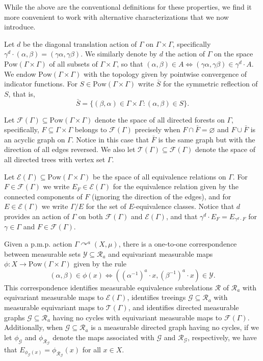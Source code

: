 \documentclass[12pt]{amsart}
\theoremstyle{definition}
\def\cal{\mathcal}
\newcommand{\pmp}{p{$.$}m{$.$}p{$.$}}
\newcommand{\acts}{\curvearrowright}
\newcommand{\Pow}[1]{\mathrm{Pow}(#1)}
\begin{document}
While the above are the conventional definitions for these properties, we find it more convenient to work with alternative characterizations that we now introduce.

Let $d$ be the diagonal translation action of $\Gamma$ on $\Gamma \times \Gamma$, specifically $\gamma^d \cdot (\alpha, \beta) = (\gamma \alpha, \gamma \beta)$. We similarly denote by $d$ the action of $\Gamma$ on the space $\Pow{\Gamma \times \Gamma}$ of all subsets of $\Gamma \times \Gamma$, so that $(\alpha, \beta) \in A \Leftrightarrow (\gamma \alpha, \gamma \beta) \in \gamma^d \cdot A$. We endow $\Pow{\Gamma \times \Gamma}$ with the topology given by pointwise convergence of indicator functions. For $S \in \Pow{\Gamma \times \Gamma}$ write $\bar S$ for the symmetric reflection of $S$, that is, $$\bar S = \{(\beta, \alpha) \in \Gamma \times \Gamma : (\alpha, \beta) \in S\}.$$

Let $\cal F(\Gamma) \subseteq \Pow{\Gamma \times \Gamma}$ denote the space of all directed forests on $\Gamma$, specifically, $F \subseteq \Gamma \times \Gamma$ belongs to $\cal F(\Gamma)$ precisely when $F \cap \bar F = \varnothing$ and $F \cup \bar F$ is an acyclic graph on $\Gamma$. Notice in this case that $\bar F$ is the same graph but with the direction of all edges reversed.  We also let $\cal T(\Gamma) \subseteq \cal F(\Gamma)$ denote the space of all directed trees with vertex set $\Gamma$.

Let $\cal E(\Gamma) \subseteq \Pow{\Gamma \times \Gamma}$ be the space of all equivalence relations on $\Gamma$. For $F \in \cal F(\Gamma)$ we write $E_F \in \cal E(\Gamma)$ for the equivalence relation given by the connected components of $F$ (ignoring the direction of the edges), and for $E \in \cal E(\Gamma)$ we write $\Gamma / E$ for the set of $E$-equivalence classes. Notice that $d$ provides an action of $\Gamma$ on both $\cal F(\Gamma)$ and $\cal E(\Gamma)$, and that $\gamma^d \cdot E_F = E_{\gamma^d \cdot F}$ for $\gamma \in \Gamma$ and $F \in \cal F(\Gamma)$.

Given a {\pmp} action $\Gamma \acts^a (X, \mu)$, there is a one-to-one correspondence between measurable sets $\cal Y \subseteq \cal R_a$ and equivariant measurable maps $\phi : X \rightarrow \Pow{\Gamma \times \Gamma}$ given by the rule
\[(\alpha, \beta) \in \phi(x) \Leftrightarrow ((\alpha^{-1})^a \cdot x, (\beta^{-1})^a \cdot x) \in \cal Y.\]
This correspondence identifies measurable equivalence subrelations $\cal R$ of $\cal R_a$ with equivariant measurable maps to $\cal E(\Gamma)$, identifies treeings $\cal G \subseteq \cal R_a$ with measurable equivariant maps to $\cal T(\Gamma)$, and identifies directed measurable graphs $\cal G \subseteq \cal R_a$ having no cycles with equivariant measurable maps to $\cal F(\Gamma)$. Additionally, when $\cal G \subseteq \cal R_a$ is a measurable directed graph having no cycles, if we let $\phi_\cal G$ and $\phi_{\cal R_\cal G}$ denote the maps associated with $\cal G$ and $\cal R_\cal G$, respectively, we have that $E_{\phi_\cal G(x)} = \phi_{\cal R_\cal G}(x)$ for all $x \in X$.
\end{document}
